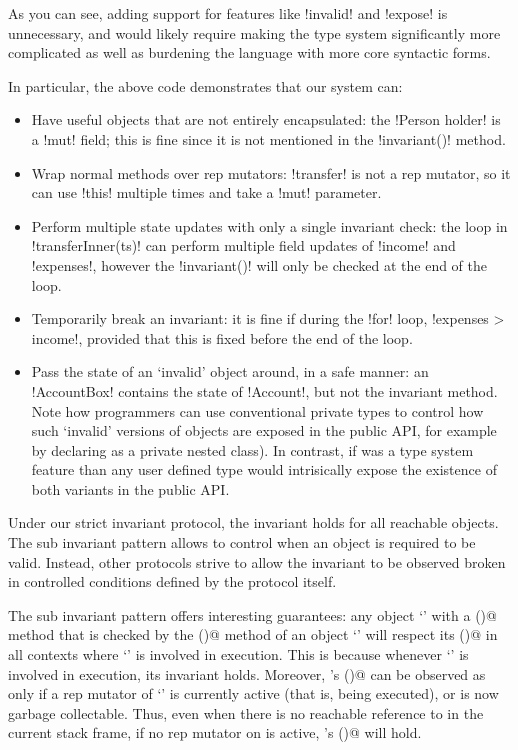 As you can see, adding support for features like \Q!invalid! and \Q!expose! is unnecessary, and would likely require making the type system significantly more complicated as well as burdening the language with more core syntactic forms.

In particular, the above code demonstrates that our system can:
\begin{itemize}
\item Have useful objects that are not entirely encapsulated: the \Q!Person holder! is a \Q!mut! field; this is fine since it is not mentioned in the \Q!invariant()! method.
\item Wrap normal methods over rep mutators: \Q!transfer! is not a rep mutator, so it can use \Q!this! multiple times and take a \Q!mut! parameter.
\item Perform multiple state updates with only a single invariant check: the loop in \Q!transferInner(ts)! can perform multiple field updates of \Q!income! and \Q!expenses!, however the \Q!invariant()! will only be checked at the end of the loop.
\item Temporarily break an invariant: it is fine if during the \Q!for! loop, \Q!expenses > income!, provided that this is fixed before the end of the loop.
\item Pass the state of an `invalid' object around, in a safe manner: an \Q!AccountBox! contains the state of \Q!Account!, but not the invariant method.
Note how programmers can use conventional private types to control how such `invalid' versions of objects are exposed in the public API, for example by 
declaring \Q@AccountBox@ as a private nested class).
In contrast, if \Q@invalid@ was a type system feature than any user defined type would intrisically expose the existence of both variants in the public API.
\end{itemize}

Under our strict invariant protocol, the invariant holds for all reachable objects.
The sub invariant pattern allows to control when an object is required to be valid.
Instead, other protocols strive to allow the invariant to be observed broken in controlled conditions defined by the protocol itself.

The sub invariant pattern offers interesting guarantees:
any object `\Q@a@' with a \Q@subInvariant()@ method that is checked by the \Q@invariant()@ method of an object `\Q@b@'
will respect its \Q@subInvariant()@ in all contexts where `\Q@b@' is involved in execution.
This is because whenever `\Q@b@' is involved in execution, its invariant holds.
Moreover, \Q@a@'s \Q@subInvariant()@ can be observed as \Q@false@ only if a rep mutator of `\Q@b@' is currently active (that is, being executed),
or \Q@b@ is now garbage collectable.
Thus, even when there is no reachable reference to \Q@b@ in the current stack frame,
if no rep mutator on \Q@b@ is active, \Q@a@'s \Q@subInvariant()@ will hold.

